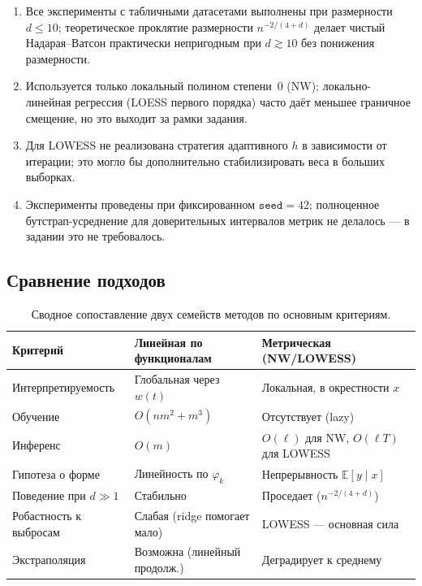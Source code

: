 \documentclass[12pt,a4paper]{article}
\theoremstyle{definition}
\theoremstyle{remark}
\newcommand{\E}{\mathbb{E}}
\begin{document}
\begin{enumerate}[leftmargin=*,itemsep=2pt,topsep=2pt]
    \item Все эксперименты с табличными датасетами выполнены при размерности
        $d\leq 10$; теоретическое проклятие размерности $n^{-2/(4+d)}$
        делает чистый Надарая--Ватсон практически непригодным при
        $d\gtrsim 10$ без понижения размерности.
    \item Используется только локальный полином степени~0 (NW); локально-линейная
        регрессия (LOESS первого порядка) часто даёт меньшее граничное
        смещение, но это выходит за рамки задания.
    \item Для LOWESS не реализована стратегия адаптивного $h$ в зависимости
        от итерации; это могло бы дополнительно стабилизировать веса в
        больших выборках.
    \item Эксперименты проведены при фиксированном $\texttt{seed}=42$;
        полноценное бутстрап-усреднение для доверительных интервалов
        метрик не делалось --- в задании это не требовалось.
\end{enumerate}

\subsection{Сравнение подходов}

\begin{table}[H]
\centering
\small
\caption{Сводное сопоставление двух семейств методов по основным критериям.}
\label{tab:summary-comparison}
\begin{tabular}{lll}
\toprule
\textbf{Критерий} & \textbf{Линейная по функционалам} & \textbf{Метрическая (NW/LOWESS)} \\
\midrule
Интерпретируемость       & Глобальная через $w(t)$        & Локальная, в окрестности $x$ \\
Обучение                 & $O(nm^{2}+m^{3})$              & Отсутствует (lazy) \\
Инференс                 & $O(m)$                         & $O(\ell)$ для NW, $O(\ell T)$ для LOWESS \\
Гипотеза о форме         & Линейность по $\varphi_{k}$    & Непрерывность $\E[y\mid x]$ \\
Поведение при $d\gg 1$   & Стабильно                      & Проседает ($n^{-2/(4+d)}$) \\
Робастность к выбросам   & Слабая (ridge помогает мало)   & LOWESS --- основная сила \\
Экстраполяция            & Возможна (линейный продолж.)    & Деградирует к среднему \\
\bottomrule
\end{tabular}
\end{table}
\end{document}
